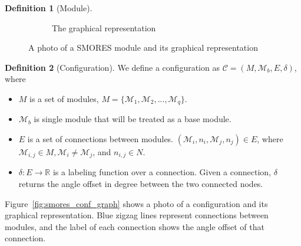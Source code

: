 \documentclass[conference]{IEEEtran}
\theoremstyle{definition}
\newtheorem{definition}{Definition}[section]
\begin{document}
\begin{definition}[Module]
\begin{figure}
\begin{center}
\begin{subfigure}[b]{0.4\columnwidth}
                \caption{The graphical representation}
                \label{fig:smores_graph}
        \end{subfigure}
\end{center}
\caption{A photo of a SMORES module and its graphical representation}
\label{fig:smores}
\end{figure}
\end{definition}

\begin{definition}[Configuration] \label{def:configuration}
We define a configuration as $\mathcal{C}=(M, \mathcal{M}_b, E, \delta)$, where
\begin{itemize}
\item $M$ is a set of modules, $M=\{\mathcal{M}_1, \mathcal{M}_2, ..., \mathcal{M}_q\}$.
\item $\mathcal{M}_b$ is single module that will be treated as a base module.
\item $E$ is a set of connections between modules. $(\mathcal{M}_i, n_i,
\mathcal{M}_j, n_j)\in E$, where $\mathcal{M}_{i,j} \in M, \mathcal{M}_i \neq
\mathcal{M}_j$, and $n_{i,j}\in N$.
\item $\delta: E \rightarrow \mathbb{R}$ is a labeling function over a
connection. Given a connection, $\delta$ returns the angle offset in degree
between the two connected nodes.
\end{itemize}
Figure~\ref{fig:smores_conf_graph} shows a photo of a configuration and its
graphical representation. Blue zigzag lines represent connections between
modules, and the label of each connection shows the angle offset of that
connection.
\end{definition}
\end{document}
